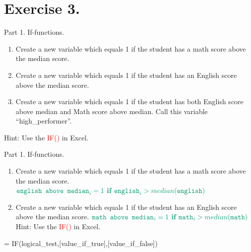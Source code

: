 \documentclass[
  10pt,
  ignorenonframetext,
]{beamer}
\newenvironment{Shaded}{\begin{snugshade}}{\end{snugshade}}
\newcommand{\NormalTok}[1]{#1}
\providecommand{\tightlist}{%
  \setlength{\itemsep}{0pt}\setlength{\parskip}{0pt}}
\begin{document}
\hypertarget{exercise-3.}{%
\section{Exercise 3.}\label{exercise-3.}}

\begin{frame}{Part 1. If-functions.}
\protect\hypertarget{part-1.-if-functions.}{}
\begin{enumerate}
\tightlist
\item
  Create a new variable which equals 1 if the student has a math score
  above the median score.
\item
  Create a new variable which equals 1 if the student has an English
  score above the median score.
\item
  Create a new variable which equals 1 if the student has both English
  score above median and Math score above median. Call this variable
  ``high\_performer''.
\end{enumerate}

Hint: Use the \textcolor{red}{IF()} in Excel.
\end{frame}

\begin{frame}[fragile]{Part 1. If-functions.}
\protect\hypertarget{part-1.-if-functions.-1}{}
\begin{enumerate}
\tightlist
\item
  Create a new variable which equals 1 if the student has a math score
  above the median score.
  \(\color{green}{\texttt{english above median}_i = 1 \textbf{ if } \texttt{english}_i > median(\texttt{english})}\)
  \pause
\item
  Create a new variable which equals 1 if the student has an English
  score above the median score.
  \(\color{green}{\texttt{math above median}_i = 1 \textbf{ if } \texttt{math}_i > median(\texttt{math})}\)
  \pause Hint: Use the \textcolor{red}{IF()} in Excel.
\end{enumerate}

\begin{Shaded}
\begin{Highlighting}[]
\NormalTok{= IF(logical\_test,[value\_if\_true],[value\_if\_false])}
\end{Highlighting}
\end{Shaded}
\end{frame}
\end{document}
